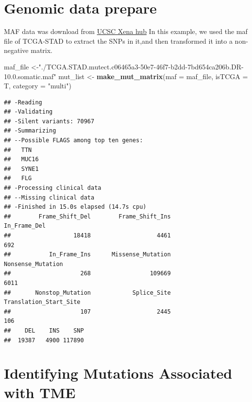 \documentclass[
  12pt,
]{book}
\newenvironment{Shaded}{\begin{snugshade}}{\end{snugshade}}
\newcommand{\AttributeTok}[1]{\textcolor[rgb]{0.13,0.29,0.53}{#1}}
\newcommand{\FunctionTok}[1]{\textcolor[rgb]{0.13,0.29,0.53}{\textbf{#1}}}
\newcommand{\NormalTok}[1]{#1}
\newcommand{\OtherTok}[1]{\textcolor[rgb]{0.56,0.35,0.01}{#1}}
\newcommand{\SpecialCharTok}[1]{\textcolor[rgb]{0.81,0.36,0.00}{\textbf{#1}}}
\newcommand{\StringTok}[1]{\textcolor[rgb]{0.31,0.60,0.02}{#1}}
\begin{document}
\hypertarget{genomic-data-prepare}{%
\section{Genomic data prepare}\label{genomic-data-prepare}}

MAF data was download from \href{https://xenabrowser.net/datapages/}{UCSC Xena hub}
In this example, we used the maf file of TCGA-STAD to extract the SNPs in it,and then transformed it into a non-negative matrix.

\begin{Shaded}
\begin{Highlighting}[]
\NormalTok{maf\_file }\OtherTok{\textless{}{-}}\StringTok{"./TCGA.STAD.mutect.c06465a3{-}50e7{-}46f7{-}b2dd{-}7bd654ca206b.DR{-}10.0.somatic.maf"}
\NormalTok{mut\_list }\OtherTok{\textless{}{-}} \FunctionTok{make\_mut\_matrix}\NormalTok{(}\AttributeTok{maf =}\NormalTok{ maf\_file, }\AttributeTok{isTCGA   =}\NormalTok{ T, }\AttributeTok{category =} \StringTok{"multi"}\NormalTok{)}
\end{Highlighting}
\end{Shaded}

\begin{verbatim}
## -Reading
## -Validating
## -Silent variants: 70967 
## -Summarizing
## --Possible FLAGS among top ten genes:
##   TTN
##   MUC16
##   SYNE1
##   FLG
## -Processing clinical data
## --Missing clinical data
## -Finished in 15.0s elapsed (14.7s cpu) 
##        Frame_Shift_Del        Frame_Shift_Ins           In_Frame_Del 
##                  18418                   4461                    692 
##           In_Frame_Ins      Missense_Mutation      Nonsense_Mutation 
##                    268                 109669                   6011 
##       Nonstop_Mutation            Splice_Site Translation_Start_Site 
##                    107                   2445                    106 
##    DEL    INS    SNP 
##  19387   4900 117890
\end{verbatim}

\begin{Shaded}
\end{Shaded}

\hypertarget{identifying-mutations-associated-with-tme}{%
\section{Identifying Mutations Associated with TME}\label{identifying-mutations-associated-with-tme}}
\end{document}
